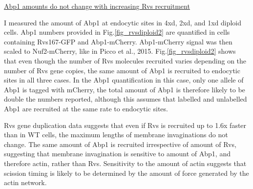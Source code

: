 \underline{Abp1 amounts do not change with increasing Rvs recruitment}
		
I measured the amount of Abp1 at endocytic sites in 4xd, 2xd, and 1xd diploid cells. Abp1 numbers provided in Fig.\ref{fig_rvsdiploid2} are quantified in cells containing Rvs167-GFP and Abp1-mCherry. Abp1-mCherry signal was then scaled to Nuf2-mCherry, like in Picco et al., 2015. Fig.\ref{fig_rvsdiploid2} shows that even though the number of Rvs molecules recruited varies depending on the number of Rvs gene copies, the same amount of Abp1 is recruited to endocytic sites in all three cases. In the Abp1 quantification in this case, only one allele of Abp1 is tagged with mCherry, the total amount of Abp1 is therefore likely to be double the numbers reported, although this assumes that labelled and unlabelled Abp1 are recruited at the same rate to endocytic sites. 

\vspace{5mm}
Rvs gene duplication data suggests that even if Rvs is recruited up to 1.6x faster than in WT cells, the maximum lengths of membrane invaginations do not change. The same amount of Abp1 is recruited irrespective of amount of Rvs, suggesting that membrane invagination is sensitive to amount of Abp1, and therefore actin, rather than Rvs. Sensitivity to the amount of actin suggests that scission timing is likely to be determined by the amount of force generated by the actin network. 


